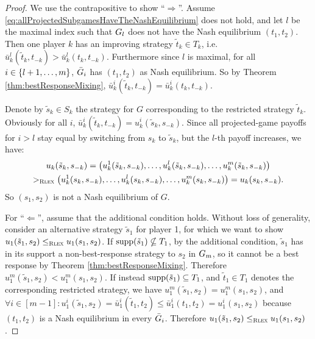 \documentclass[a4paper,DIV=11,abstracton,twoside=semi]{scrreprt}
\theoremstyle{definition}
\begin{document}
    \begin{proof}
        We use the contrapositive to show “$\Rightarrow$”. Assume \eqref{eq:allProjectedSubgamesHaveTheNashEquilibrium} does not hold, and let $l$ be the maximal index such that $G_{l}$ does not have the Nash equilibrium $(t_1, t_2)$.
        Then one player $k$ has an improving strategy $\tilde{t}_k \in T_k$, i.e.
        $\bar{u}_k^l(\tilde{t}_k, t_{-k}) > \bar{u}_k^l(t_k, t_{-k})$.
        Furthermore since $l$ is maximal, for all $i \in \{l+1, \dots, m\}$, $\bar{G}_{i}$ has $(t_1, t_2)$ as Nash equilibrium.
        So by Theorem \ref{thm:bestResponseMixing}, $\bar{u}_k^i(\tilde{t}_k, t_{-k}) = \bar{u}_k^i(t_k, t_{-k})$.
        
        Denote by $\tilde{s}_k \in S_k$ the strategy for $G$ corresponding to the restricted strategy $\tilde{t}_k$.
        Obviously for all $i$, $\bar{u}_k^i(\tilde{t}_k, t_{-k}) = u_k^i(\tilde{s}_k, s_{-k})$.
        Since all projected-game payoffs for $i > l$ stay equal by switching from $s_k$ to $\tilde{s}_k$, but the $l$-th payoff increases, we have:
        \begin{multline*}
                         u_k(\tilde{s}_k, s_{-k}) 
                       = \bigl(u_k^{1}(\tilde{s}_k, s_{-k}), \dots, u_k^l(\tilde{s}_k, s_{-k}), \dots, u_k^{m}(\tilde{s}_k, s_{-k})\bigr) \\
            >_{\textsc{Rlex}} \bigl(u_k^{1}(s_k, s_{-k}), \dots, u_k^l(s_k, s_{-k}), \dots, u_k^{m}(s_k, s_{-k})\bigr)
                       = u_k(s_k, s_{-k}).
        \end{multline*}
        So $(s_1, s_2)$ is not a Nash equilibrium of $G$.
        
        For “$\Leftarrow$”, assume that the additional condition holds.
        Without loss of generality, consider an alternative strategy $\tilde{s}_1$ for player 1, for which we want to show $u_1(\tilde{s}_1, s_2) \leq_{\textsc{Rlex}} u_1(s_1, s_2)$.
        If $\operatorname{supp} (\tilde{s}_1) \nsubseteq T_1$, by the additional condition, $\tilde{s}_1$ has in its support a non-best-response strategy to $s_2$ in $G_{m}$, so it cannot be a best response by Theorem \ref{thm:bestResponseMixing}. Therefore $u_1^m(\tilde{s}_1, s_2) < u_1^m(s_1, s_2)$.
        If instead $\operatorname{supp} (\tilde{s}_1) \subseteq T_1$, and $\tilde{t}_1 \in T_1$ denotes the corresponding restricted strategy,
        we have $u_1^m(\tilde{s}_1, s_2) = u_1^m(s_1, s_2)$, and  $\forall i \in [m - 1]: u_1^i(\tilde{s}_1, s_2) = \bar{u}_1^i(\tilde{t}_1, t_2) \leq \bar{u}_1^i(t_1, t_2) = u_1^i(s_1, s_2)$ because $(t_1, t_2)$ is a Nash equilibrium in every $\bar{G}_{i}$. Therefore $u_1(\tilde{s}_1, s_2) \leq_{\textsc{Rlex}} u_1(s_1, s_2)$.
    \end{proof}
\end{document}
